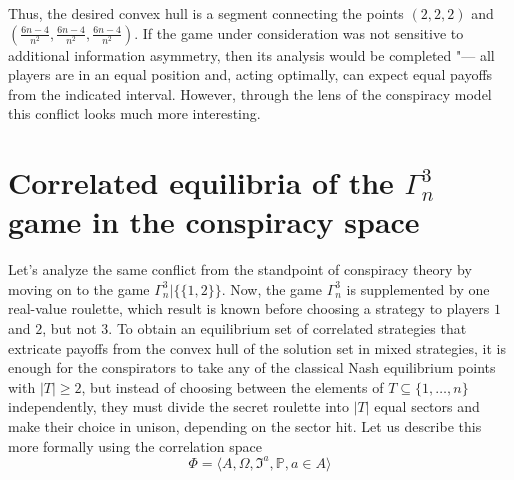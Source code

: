 Thus, the desired convex hull is a segment connecting the points $(2, 2, 2)$ and $(\frac{6 n - 4}{n^2}, \frac{6 n - 4}{n^2} , \frac{6 n - 4}{n^2})$. If the game under consideration was not sensitive to additional information asymmetry, then its analysis would be completed "--- all players are in an equal position and, acting optimally, can expect equal payoffs from the indicated interval. However, through the lens of the conspiracy model this conflict looks much more interesting. %

\section{Correlated equilibria of the $\Gamma^3_n$ game in the conspiracy space}\label{sec:ch2/sec4}

Let's analyze the same conflict from the standpoint of conspiracy theory by moving on to the game $\Gamma^3_n | \{\{1,2\}\}$. Now, the game $\Gamma^3_n$ is supplemented by one real-value roulette, which result is known before choosing a strategy to players $1$ and $2$, but not $3$. To obtain an equilibrium set of correlated strategies that extricate payoffs from the convex hull of the solution set in mixed strategies, it is enough for the conspirators to take any of the classical Nash equilibrium points with $\left| T \right| \ge 2$, but instead of choosing between the elements of $T \subseteq \{1, \ldots, n\}$ independently, they must divide the secret roulette into $\left| T \right|$ equal sectors and make their choice in unison, depending on the sector hit. Let us describe this more formally using the correlation space %
\begin{equation*}
	\Phi = \langle A, \Omega, \mathfrak{I}^a, \mathbb{P}, a \in A \rangle
\end{equation*}

